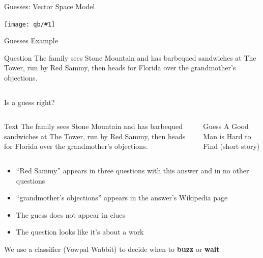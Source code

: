 \documentclass[compress]{beamer}
\newcommand{\gfxq}[2]{
\begin{center}
	\texttt{[image: qb/\#1]}
\end{center}
}
\begin{document}
\begin{frame}{Guesses: Vector Space Model}

  \gfxq{embedding}{1.0}

\end{frame}


\begin{frame}{Guesses Example}

	\begin{block}{Question}
	The family sees Stone Mountain and has barbequed sandwiches at The Tower, run by Red Sammy, then heads for Florida over the grandmother's objections.
	\end{block}
	
	\begin{columns}
		
	\end{columns}

\end{frame}

\begin{frame}{Is a guess right?}

	\begin{columns}
	\column{.75\linewidth}
	\begin{block}{Text}
	The family sees Stone Mountain and has barbequed sandwiches at The Tower, run by Red Sammy, then heads for Florida over the grandmother's objections.
	\end{block}
	\column{.25\linewidth}
	\begin{block}{Guess}
	A Good Man is Hard to Find (short story)
	\end{block}
	\end{columns}
	
	\begin{itemize}
		\item ``Red Sammy'' appears in three questions with this answer and in no other questions
		\item ``grandmother's objections'' appears in the answer's Wikipedia page
		\item The guess does not appear in clues
		\item The question looks like it's about a work
	\end{itemize}
	
	\pause
	
	We use a classifier (Vowpal Wabbit) to decide when to {\bf buzz} or {\bf wait}

\end{frame}
\end{document}
